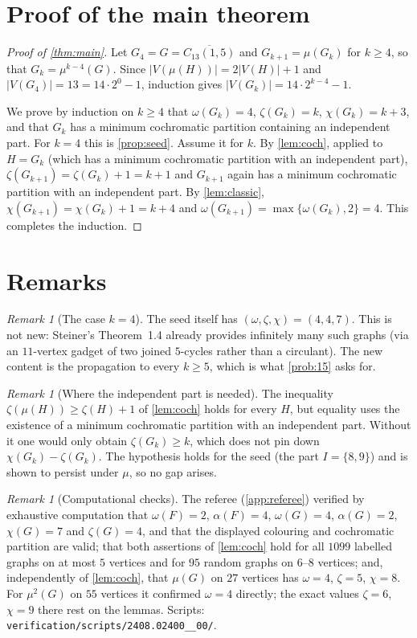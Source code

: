 \documentclass[11pt,a4paper]{article}
\theoremstyle{plain}
\theoremstyle{definition}
\theoremstyle{remark}
\newtheorem{remark}[theorem]{Remark}
\newcommand{\myc}{\mu}
\begin{document}
\section{Proof of the main theorem}\label{sec:main}

\begin{proof}[Proof of \cref{thm:main}]
Let $G_4=G=\overline{C_{13}(1,5)}$ and $G_{k+1}=\myc(G_k)$ for $k\ge4$, so that $G_k=\myc^{k-4}(G)$. Since $|V(\myc(H))|=2|V(H)|+1$ and $|V(G_4)|=13=14\cdot2^0-1$, induction gives $|V(G_k)|=14\cdot2^{k-4}-1$.

We prove by induction on $k\ge4$ that $\omega(G_k)=4$, $\zeta(G_k)=k$, $\chi(G_k)=k+3$, and that $G_k$ has a minimum cochromatic partition containing an independent part. For $k=4$ this is \cref{prop:seed}. Assume it for $k$. By \cref{lem:coch}, applied to $H=G_k$ (which has a minimum cochromatic partition with an independent part), $\zeta(G_{k+1})=\zeta(G_k)+1=k+1$ and $G_{k+1}$ again has a minimum cochromatic partition with an independent part. By \cref{lem:classic}, $\chi(G_{k+1})=\chi(G_k)+1=k+4$ and $\omega(G_{k+1})=\max\{\omega(G_k),2\}=4$. This completes the induction.
\end{proof}

\section{Remarks}

\begin{remark}[The case $k=4$]
The seed itself has $(\omega,\zeta,\chi)=(4,4,7)$. This is not new: Steiner's Theorem~1.4 \cite{Steiner24} already provides infinitely many such graphs (via an $11$-vertex gadget of two joined $5$-cycles rather than a circulant). The new content is the propagation to every $k\ge5$, which is what \cref{prob:15} asks for.
\end{remark}

\begin{remark}[Where the independent part is needed]
The inequality $\zeta(\myc(H))\ge\zeta(H)+1$ of \cref{lem:coch} holds for every $H$, but equality uses the existence of a minimum cochromatic partition with an independent part. Without it one would only obtain $\zeta(G_k)\ge k$, which does not pin down $\chi(G_k)-\zeta(G_k)$. The hypothesis holds for the seed (the part $I=\{8,9\}$) and is shown to persist under $\myc$, so no gap arises.
\end{remark}

\begin{remark}[Computational checks]
The referee (\cref{app:referee}) verified by exhaustive computation that $\omega(F)=2$, $\alpha(F)=4$, $\omega(G)=4$, $\alpha(G)=2$, $\chi(G)=7$ and $\zeta(G)=4$, and that the displayed colouring and cochromatic partition are valid; that both assertions of \cref{lem:coch} hold for all $1099$ labelled graphs on at most $5$ vertices and for $95$ random graphs on $6$--$8$ vertices; and, independently of \cref{lem:coch}, that $\myc(G)$ on $27$ vertices has $\omega=4$, $\zeta=5$, $\chi=8$. For $\myc^2(G)$ on $55$ vertices it confirmed $\omega=4$ directly; the exact values $\zeta=6$, $\chi=9$ there rest on the lemmas. Scripts: \texttt{verification/scripts/2408.02400\_\_00/}.
\end{remark}
\end{document}
